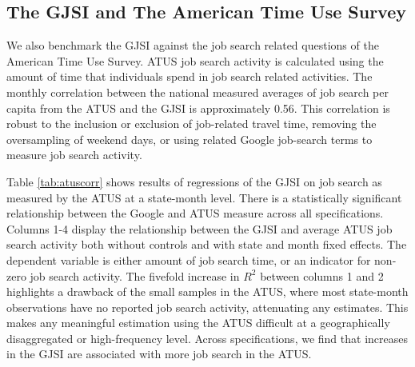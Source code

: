 \documentclass[12pt]{article}
\begin{document}
\begin{spacing}{2}
\subsection{The GJSI and The American Time Use Survey}\label{sec:atus}
We also benchmark the GJSI against the job search related questions of the American Time Use Survey. ATUS job search activity is calculated using the amount of time that individuals spend in job search related activities.\footnotemark{} The monthly correlation between the national measured averages of job search per capita from the ATUS and the GJSI is approximately 0.56. This correlation is robust to the inclusion or exclusion of job-related travel time, removing the oversampling of weekend days, or using related Google job-search terms to measure job search activity.

Table \ref{tab:atuscorr} shows results of regressions of the GJSI on job search as measured by the ATUS at a state-month level. There is a statistically significant relationship between the Google and ATUS measure across all specifications. Columns 1-4 display the relationship between the GJSI and average ATUS job search activity both without controls and with state and month fixed effects. The dependent variable is either amount of job search time, or an indicator for non-zero job search activity. The fivefold increase in $R^2$ between columns 1 and 2 highlights a drawback of the small samples in the ATUS, where most state-month observations have no reported job search activity, attenuating any estimates. This makes any meaningful estimation using the ATUS difficult at a geographically disaggregated or high-frequency level. Across specifications, we find that increases in the GJSI are associated with more job search in the ATUS.


\end{spacing}
\end{document}
